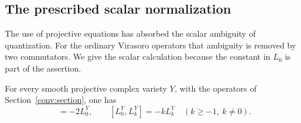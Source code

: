 \subsection{The prescribed scalar normalization}

The use of projective equations has absorbed the scalar ambiguity
of quantization. For the ordinary Virasoro operators that
ambiguity is removed by two commutators. We give the scalar
calculation because the constant in $L_0$ is part of the
assertion.

\begin{lemma}
\label{cont:commutators}
For every smooth projective complex variety $Y$, with the
operators of Section~\ref{conv:section}, one has
\begin{equation}
 [L_{-1}^Y,L_1^Y]=-2L_0^Y,\qquad
 [L_0^Y,L_k^Y]=-kL_k^Y\quad(k\geq-1,\ k\neq0).
 \label{cont:exact-commutators}
\end{equation}
\end{lemma}

